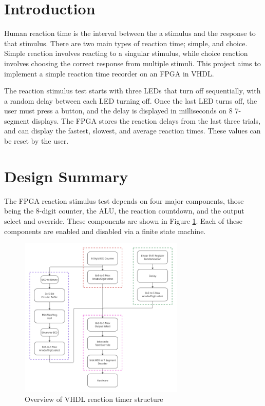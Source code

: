 \documentclass[11pt]{article}
\begin{document}
\newpage
{}

\section{Introduction}

Human reaction time is the interval between the a stimulus and the response to that stimulus. There are two main types of reaction time; simple, and choice. Simple reaction involves reacting to a singular stimulus, while choice reaction involves choosing the correct response from multiple stimuli. This project aims to implement a simple reaction time recorder on an FPGA in VHDL.

The reaction stimulus test starts with three LEDs that turn off sequentially, with a random delay between each LED turning off. Once the last LED turns off, the user must press a button, and the delay is displayed in milliseconds on 8 7-segment displays. The FPGA stores the reaction delays from the last three trials, and can display the fastest, slowest, and average reaction times. These values can be reset by the user.

\section{Design Summary}

The FPGA reaction stimulus test depends on four major components, those being the 8-digit counter, the ALU, the reaction countdown, and the output select and override. These components are shown in Figure \ref{project_structure}. Each of these components are enabled and disabled via a finite state machine.

\begin{figure}[H]
  \centering
  \includegraphics[width=0.7\textwidth]{project_overall_structure.png}
  \caption{Overview of VHDL reaction timer structure}
  \label{project_structure}
\end{figure}
\end{document}
